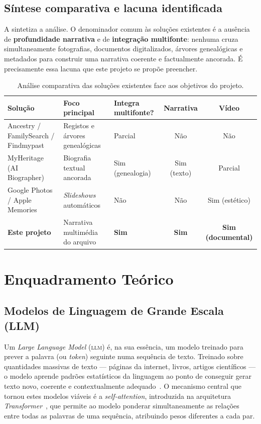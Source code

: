 \subsection{Síntese comparativa e lacuna identificada}
\label{sub:lacuna}

A  sintetiza a análise. O denominador comum às
soluções existentes é a ausência de \textbf{profundidade narrativa} e de
\textbf{integração multifonte}: nenhuma cruza simultaneamente
fotografias, documentos digitalizados, árvores genealógicas e metadados
para construir uma narrativa coerente e factualmente ancorada. É
precisamente essa lacuna que este projeto se propõe preencher.

\begin{table}[H]
\centering
\caption{Análise comparativa das soluções existentes face aos objetivos
do projeto.}
\label{tab:comparativo}
\small
\begin{tabularx}{\linewidth}{@{}p{3.1cm}YYcc@{}}
\toprule
\textbf{Solução} & \textbf{Foco principal} & \textbf{Integra
multifonte?} & \textbf{Narrativa} & \textbf{Vídeo} \\
\midrule
Ancestry / FamilySearch / Findmypast & Registos e árvores genealógicas &
Parcial & Não & Não \\
MyHeritage (AI Biographer) & Biografia textual ancorada & Sim
(genealogia) & Sim (texto) & Parcial \\
Google Photos / Apple Memories & \emph{Slideshows} automáticos & Não &
Não & Sim (estético) \\
\textbf{Este projeto} & Narrativa multimédia do arquivo & \textbf{Sim} &
\textbf{Sim} & \textbf{Sim (documental)} \\
\bottomrule
\end{tabularx}
\end{table}

\section{Enquadramento Teórico}
\label{sec:enquadramento}

\subsection{Modelos de Linguagem de Grande Escala (LLM)}
\label{sub:llm}

Um \emph{Large Language Model} (\textsc{llm}) é, na sua essência, um
modelo treinado para prever a palavra (ou \emph{token}) seguinte numa
sequência de texto. Treinado sobre quantidades massivas de texto —
páginas da internet, livros, artigos científicos — o modelo aprende
padrões estatísticos da linguagem ao ponto de conseguir gerar texto novo,
coerente e contextualmente adequado~\cite{brown2020gpt3}. O mecanismo
central que tornou estes modelos viáveis é a \emph{self-attention},
introduzida na arquitetura \emph{Transformer}~\cite{vaswani2017attention},
que permite ao modelo ponderar simultaneamente as relações entre todas as
palavras de uma sequência, atribuindo pesos diferentes a cada par.

